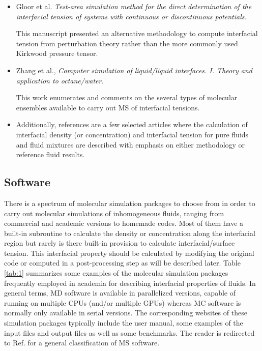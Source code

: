 \documentclass[9pt,tutorial]{livecoms}
\begin{document}
\begin{itemize}
\item Gloor et al. \textit{Test-area simulation method for the direct determination of the interfacial tension of systems with continuous or discontinuous potentials.} \citep{gloor2005}
  
  This manuscript presented an alternative methodology to compute interfacial tension from perturbation theory rather than the more commonly used Kirkwood pressure tensor.

\item Zhang et al., \textit{Computer simulation of liquid/liquid interfaces. I. Theory and application to octane/water.} \citep{zhang1995}

  This work enumerates and comments on the several types of molecular ensembles available to carry out MS of interfacial tensions.

\item Additionally, references \citep{walton1983,chapela1977,trokhymchuk1999,mecke1997,mecke1999,duque2004,errington2007,stephan2019} are a few
  selected articles where the calculation of interfacial density (or
  concentration) and interfacial tension for pure fluids and fluid mixtures are
  described with emphasis on either methodology or reference fluid results. 

\end{itemize}

\subsection{Software}
There is
a spectrum of molecular simulation packages to choose from
in order to carry out molecular simulations of inhomogeneous fluids,
ranging from commercial and academic
versions to homemade codes. Most of them have a built-in subroutine to
calculate the density or concentration along the interfacial region but rarely
is there built-in provision to calculate interfacial/surface tension. This
interfacial property should be calculated by modifying the original code or
computed in a post-processing step as will be described later. Table
\ref{tab:1} summarizes some examples of the molecular simulation packages frequently
employed in academia for describing interfacial properties of fluids. In
general terms, MD software is available in parallelized versions, capable of
running on multiple CPUs (and/or multiple GPUs) whereas MC software is normally
only available in serial versions. The corresponding websites of these
simulation packages typically include the user manual, some examples of the input
files and output files as well as some benchmarks. The reader is redirected to
Ref. \citep{wiki} for a general classification of MS software. 
\end{document}
